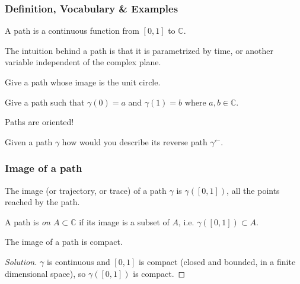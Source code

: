 \subsubsection{Definition, Vocabulary \& Examples}
\begin{defi}[Path]
    A path is a continuous function from $[0, 1]$ to $\mathbb{C}$.
\end{defi}

\begin{note}
    The intuition behind a path is that it is parametrized by time, or another variable independent of the complex plane.
\end{note}

\begin{exo}
    Give a path whose image is the unit circle.
\end{exo}

\begin{exo}
    Give a path such that $\gamma(0) = a$ and $\gamma(1) = b$ where $a, b \in \mathbb{C}$. 
\end{exo}

\begin{note}
    Paths are oriented!
\end{note}

\begin{exo}
    Given a path $\gamma$ how would you describe its reverse path $\gamma^{\leftarrow}$.
\end{exo}


\subsubsection{Image of a path}
\begin{defi}
    The image (or trajectory, or trace) of a path $\gamma$ is $\gamma([0,1])$, all the points reached by the path.
\end{defi}

\begin{defi}
    A path is \emph{on $A\subset\mathbb{C}$} if its image is a subset of $A$, i.e. $\gamma([0,1])\subset A$.
\end{defi}

\begin{exo}
    The image of a path is compact.
\end{exo}

\begin{proof}[Solution]
    $\gamma$ is continuous and $[0,1]$ is compact (closed and bounded, in a finite dimensional space), so $\gamma([0,1])$ is compact.
\end{proof}

